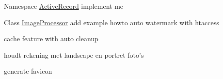\label{todo__todo000002}
\hypertarget{todo__todo000002}{}
 
\begin{DoxyDescription}
\item[Namespace \hyperlink{namespace_active_record}{ActiveRecord} ]implement me


\end{DoxyDescription}

\label{todo__todo000001}
\hypertarget{todo__todo000001}{}
 
\begin{DoxyDescription}
\item[Class \hyperlink{class_image_processor}{ImageProcessor} ]add example howto auto watermark with htaccess 

cache feature with auto cleanup 

houdt rekening met landscape en portret foto's 

generate favicon
\end{DoxyDescription}